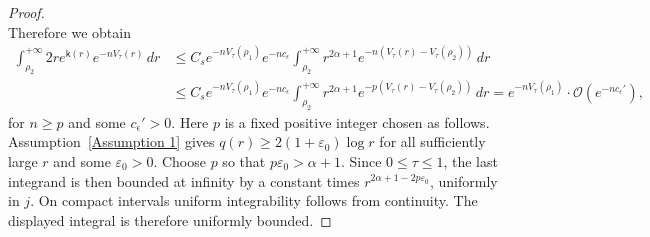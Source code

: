 \documentclass[10pt,a4paper]{amsart}
\begin{document}
\begin{proof}
\begin{equation}
\end{equation}
Therefore we obtain
\begin{align*}
    \int_{\rho_2}^{+\infty}2re^{\mathsf{k}(r)}e^{-nV_{\tau}(r)}\,dr
    &\leq 
    C_s e^{-nV_{\tau}(\rho_1)}
    e^{-nc_\epsilon}\int_{\rho_2}^{+\infty}r^{2\alpha+1}e^{-n(V_{\tau}(r)-V_{\tau}(\rho_2))}\,dr
    \\
    &\leq 
   C_s e^{-nV_{\tau}(\rho_1)}e^{-nc_{\epsilon}}
    \int_{\rho_2}^{+\infty}r^{2\alpha+1}e^{-p(V_{\tau}(r)-V_{\tau}(\rho_2))}\,dr
    =e^{-nV_{\tau}(\rho_1)}\cdot \mathcal{O}(e^{-nc_{\epsilon}'}),
\end{align*}
for $n\geq p$ and some $c_\epsilon'>0$.  Here $p$ is a fixed positive
integer chosen as follows.  Assumption~\ref{Assumption 1} gives
$q(r)\geq2(1+\varepsilon_0)\log r$ for all sufficiently large $r$ and
some $\varepsilon_0>0$.  Choose $p$ so that $p\varepsilon_0>\alpha+1$.
Since $0\leq\tau\leq1$, the last integrand is then bounded at infinity
by a constant times $r^{2\alpha+1-2p\varepsilon_0}$, uniformly in $j$.
On compact intervals uniform integrability follows from continuity.
The displayed integral is therefore uniformly bounded.


\end{proof}
\end{document}
